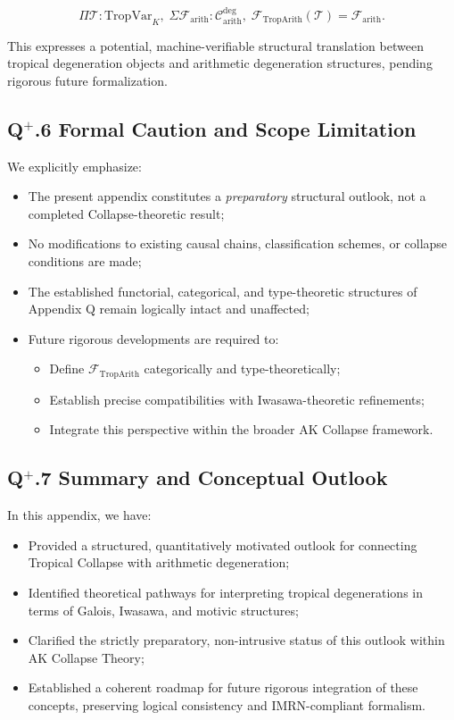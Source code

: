 \documentclass[11pt]{article}
\begin{document}
\[
\Pi \mathcal{T} : \mathrm{TropVar}_K,\;
\Sigma \mathcal{F}_{\mathrm{arith}} : \mathcal{C}_{\mathrm{arith}}^{\mathrm{deg}},\;
\mathcal{F}_{\mathrm{TropArith}}(\mathcal{T}) = \mathcal{F}_{\mathrm{arith}}.
\]

This expresses a potential, machine-verifiable structural translation between tropical degeneration objects and arithmetic degeneration structures, pending rigorous future formalization.

\subsection*{Q$^{+}$.6 Formal Caution and Scope Limitation}

We explicitly emphasize:

\begin{itemize}
    \item The present appendix constitutes a \emph{preparatory} structural outlook, not a completed Collapse-theoretic result;
    \item No modifications to existing causal chains, classification schemes, or collapse conditions are made;
    \item The established functorial, categorical, and type-theoretic structures of Appendix Q remain logically intact and unaffected;
    \item Future rigorous developments are required to:
    \begin{itemize}
        \item Define $\mathcal{F}_{\mathrm{TropArith}}$ categorically and type-theoretically;
        \item Establish precise compatibilities with Iwasawa-theoretic refinements;
        \item Integrate this perspective within the broader AK Collapse framework.
    \end{itemize}
\end{itemize}

\subsection*{Q$^{+}$.7 Summary and Conceptual Outlook}

In this appendix, we have:

\begin{itemize}
    \item Provided a structured, quantitatively motivated outlook for connecting Tropical Collapse with arithmetic degeneration;
    \item Identified theoretical pathways for interpreting tropical degenerations in terms of Galois, Iwasawa, and motivic structures;
    \item Clarified the strictly preparatory, non-intrusive status of this outlook within AK Collapse Theory;
    \item Established a coherent roadmap for future rigorous integration of these concepts, preserving logical consistency and IMRN-compliant formalism.
\end{itemize}
\end{document}
